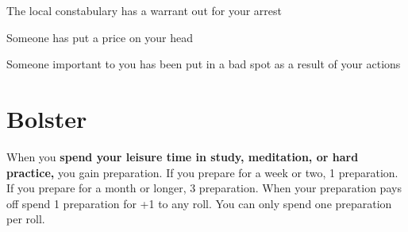        
\startitemize[1,packed]
         
\item The local constabulary has a warrant out for your arrest

         
\item Someone has put a price on your head

         
\item Someone important to you has been put in a bad spot as a result of your actions

       
\stopitemize
       
\section{Bolster}   
       

When you {\bf spend your leisure time in study, meditation, or hard practice,}  you gain preparation. If you prepare for a week or two, 1 preparation. If you prepare for a month or longer, 3 preparation. When your preparation pays off spend 1 preparation for +1 to any roll. You can only spend one preparation per roll.

                
